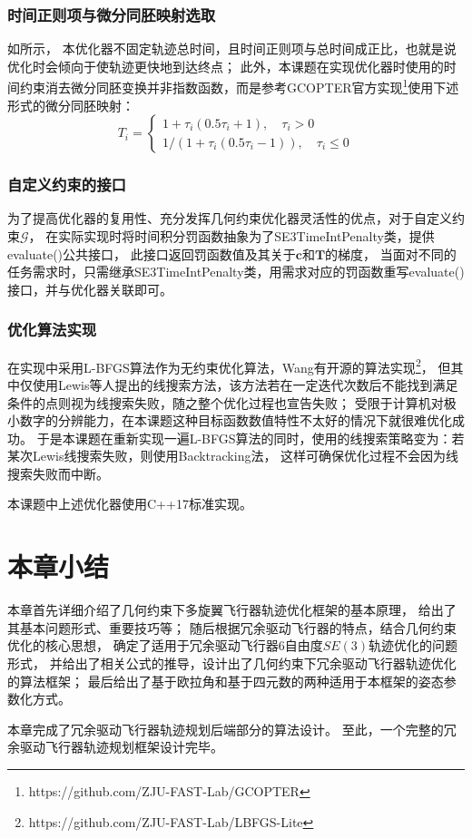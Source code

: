 \subsubsection{时间正则项与微分同胚映射选取}
如所示， 
本优化器不固定轨迹总时间，且时间正则项与总时间成正比，也就是说优化时会倾向于使轨迹更快地到达终点；
此外，本课题在实现优化器时使用的时间约束消去微分同胚变换并非指数函数，而是参考GCOPTER官方实现\footnote{https://github.com/ZJU-FAST-Lab/GCOPTER}使用下述形式的微分同胚映射：
\begin{equation}
  T_i = 
  \begin{cases}
    1 + \tau_i(0.5\tau_i + 1), \quad \tau_i > 0 \\
    {1}/(1 + \tau_i(0.5\tau_i - 1)), \quad \tau_i \leq 0
  \end{cases}
  \label{equ:the_actual_diffeomorphism_used}
\end{equation}

\subsubsection{自定义约束的接口}
为了提高优化器的复用性、充分发挥几何约束优化器灵活性的优点，对于自定义约束$\mathcal{G}$，
在实际实现时将时间积分罚函数抽象为了SE3TimeIntPenalty类，提供evaluate()公共接口，
此接口返回罚函数值及其关于$\bm{c}$和$\bm{T}$的梯度，
当面对不同的任务需求时，只需继承SE3TimeIntPenalty类，用需求对应的罚函数重写evaluate()接口，并与优化器关联即可。

\subsubsection{优化算法实现}\label{subsubsec:impl_of_opt_algo}
在实现中采用L-BFGS算法\cite{liu1989limited}作为无约束优化算法，Wang有开源的算法实现\footnote{https://github.com/ZJU-FAST-Lab/LBFGS-Lite}，
但其中仅使用Lewis等人提出的线搜索方法\cite{lewis2013nonsmooth}，该方法若在一定迭代次数后不能找到满足条件的点则视为线搜索失败，随之整个优化过程也宣告失败；
受限于计算机对极小数字的分辨能力，在本课题这种目标函数数值特性不太好的情况下就很难优化成功。
于是本课题在重新实现一遍L-BFGS算法的同时，使用的线搜索策略变为：若某次Lewis线搜索失败，则使用Backtracking法，
这样可确保优化过程不会因为线搜索失败而中断。

本课题中上述优化器使用C++17标准实现。

\section{本章小结}\label{sec:summary_4}
本章首先详细介绍了几何约束下多旋翼飞行器轨迹优化框架的基本原理，
给出了其基本问题形式、重要技巧等；
随后根据冗余驱动飞行器的特点，结合几何约束优化的核心思想，
确定了适用于冗余驱动飞行器6自由度$SE(3)$轨迹优化的问题形式，
并给出了相关公式的推导，设计出了几何约束下冗余驱动飞行器轨迹优化的算法框架；
最后给出了基于欧拉角和基于四元数的两种适用于本框架的姿态参数化方式。

本章完成了冗余驱动飞行器轨迹规划后端部分的算法设计。
至此，一个完整的冗余驱动飞行器轨迹规划框架设计完毕。

